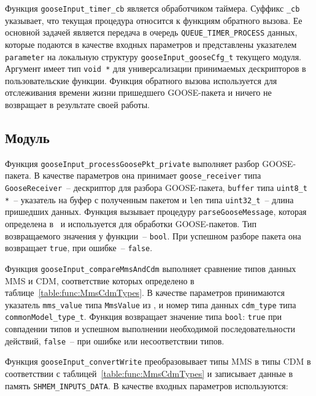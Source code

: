 Функция \lstinline{gooseInput_timer_cb} является обработчиком таймера. Суффикс \lstinline{_cb} указывает, что текущая процедура относится к функциям обратного вызова. Ее основной задачей
является передача в очередь \lstinline{QUEUE_TIMER_PROCESS} данных, которые подаются в качестве входных параметров и представлены указателем \lstinline{parameter} на локальную структуру \lstinline{gooseInput_gooseCfg_t} текущего модуля.
Аргумент имеет тип \lstinline{void *} для универсализации принимаемых
дескрипторов в пользовательские функции.
Функция обратного вызова используется для отслеживания времени жизни пришедшего GOOSE-пакета и ничего не возвращает в результате своей работы.

\subsection{Модуль \moduleProcessPackets}

Функция \lstinline{gooseInput_processGoosePkt_private} выполняет разбор GOOSE-пакета. В качестве параметров она принимает \lstinline{goose_receiver} типа
\lstinline{GooseReceiver}~-- дескриптор
для разбора GOOSE-пакета, \lstinline{buffer} типа \lstinline{uint8_t *}~-- указатель на буфер с полученным пакетом и \lstinline{len} типа \lstinline{uint32_t}~-- длина пришедших данных. Функция вызывает процедуру \lstinline{parseGooseMessage},
которая определена в \libIec\ и используется для обработки GOOSE-пакетов. Тип возвращаемого значения у функции~-- \lstinline{bool}. При успешном разборе пакета она возвращает
\lstinline{true}, при ошибке~-- \lstinline{false}.

Функция \lstinline{gooseInput_compareMmsAndCdm} выполняет сравнение типов данных MMS и CDM, соответствие которых определено в таблице~\ref{table:func:MmsCdmTypes}.
В качестве параметров принимаются указатель
\lstinline{mms_value} типа \lstinline{MmsValue} из \libIec, и номер типа данных
\lstinline{cdm_type} типа \lstinline{commonModel_type_t}. Функция возвращает значение типа
\lstinline{bool}: \lstinline{true} при совпадении типов и успешном выполнении
необходимой последовательности действий, \lstinline{false}~-- при ошибке или
несоответствии типов.


Функция \lstinline{gooseInput_convertWrite} преобразовывает типы MMS в типы CDM
в соответствии с таблицей~\ref{table:func:MmsCdmTypes} и записывает данные в память \lstinline{SHMEM_INPUTS_DATA}. В качестве входных параметров используются:

